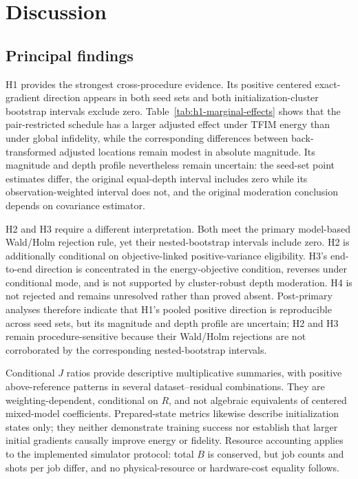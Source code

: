 \documentclass[pdflatex,sn-mathphys-num,Numbered]{sn-jnl}
\begin{document}
\section{Discussion}

\subsection{Principal findings}

H1 provides the strongest cross-procedure evidence. Its positive centered exact-gradient direction appears in both seed sets and both initialization-cluster bootstrap intervals exclude zero. Table~\ref{tab:h1-marginal-effects} shows that the pair-restricted schedule has a larger adjusted effect under TFIM energy than under global infidelity, while the corresponding differences between back-transformed adjusted locations remain modest in absolute magnitude. Its magnitude and depth profile nevertheless remain uncertain: the seed-set point estimates differ, the original equal-depth interval includes zero while its observation-weighted interval does not, and the original moderation conclusion depends on covariance estimator.

H2 and H3 require a different interpretation. Both meet the primary model-based Wald/Holm rejection rule, yet their nested-bootstrap intervals include zero. H2 is additionally conditional on objective-linked positive-variance eligibility. H3's end-to-end direction is concentrated in the energy-objective condition, reverses under conditional mode, and is not supported by cluster-robust depth moderation. H4 is not rejected and remains unresolved rather than proved absent. Post-primary analyses therefore indicate that H1's pooled positive direction is reproducible across seed sets, but its magnitude and depth profile are uncertain; H2 and H3 remain procedure-sensitive because their Wald/Holm rejections are not corroborated by the corresponding nested-bootstrap intervals.

Conditional $J$ ratios provide descriptive multiplicative summaries, with positive above-reference patterns in several dataset--residual combinations. They are weighting-dependent, conditional on $R$, and not algebraic equivalents of centered mixed-model coefficients. Prepared-state metrics likewise describe initialization states only; they neither demonstrate training success nor establish that larger initial gradients causally improve energy or fidelity. Resource accounting applies to the implemented simulator protocol: total $B$ is conserved, but job counts and shots per job differ, and no physical-resource or hardware-cost equality follows.
\end{document}
